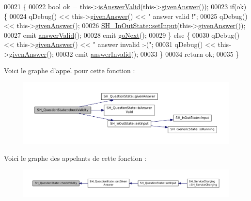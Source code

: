 \begin{DoxyCode}
00021 \{
00022     \textcolor{keywordtype}{bool} ok = this->\hyperlink{classSH__QuestionState_a8780740599e2e183560a670ff9874708}{isAnswerValid}(this->\hyperlink{classSH__QuestionState_a29cdea8bc55e39e3ed02d24743c30f8c}{givenAnswer}());
00023     \textcolor{keywordflow}{if}(ok) \{
00024         qDebug() << this->\hyperlink{classSH__QuestionState_a29cdea8bc55e39e3ed02d24743c30f8c}{givenAnswer}() << \textcolor{stringliteral}{" answer valid !"};
00025         qDebug() << this->\hyperlink{classSH__QuestionState_a29cdea8bc55e39e3ed02d24743c30f8c}{givenAnswer}();
00026         \hyperlink{classSH__InOutState_aaec9c2b5ef7c406bff7469461352d47c}{SH\_InOutState::setInput}(this->\hyperlink{classSH__QuestionState_a29cdea8bc55e39e3ed02d24743c30f8c}{givenAnswer}());
00027         emit \hyperlink{classSH__QuestionState_a04e259643788d15ab6244bc8a04286d6}{answerValid}();
00028         emit \hyperlink{classSH__GenericState_a34c1bebc765cc3a62d66c94c37d4f0c3}{goNext}();
00029     \} \textcolor{keywordflow}{else} \{
00030         qDebug() << this->\hyperlink{classSH__QuestionState_a29cdea8bc55e39e3ed02d24743c30f8c}{givenAnswer}() << \textcolor{stringliteral}{" answer invalid :-("};
00031         qDebug() << this->\hyperlink{classSH__QuestionState_a29cdea8bc55e39e3ed02d24743c30f8c}{givenAnswer}();
00032         emit \hyperlink{classSH__QuestionState_a3348a8a683130678ac87a10ba2a25486}{answerInvalid}();
00033     \}
00034     \textcolor{keywordflow}{return} ok;
00035 \}
\end{DoxyCode}


Voici le graphe d'appel pour cette fonction \-:
\nopagebreak
\begin{figure}[H]
\begin{center}
\leavevmode
\includegraphics[width=350pt]{classSH__QuestionState_a902be003650c33d954d707b2d3ee0bb9_cgraph}
\end{center}
\end{figure}




Voici le graphe des appelants de cette fonction \-:\nopagebreak
\begin{figure}[H]
\begin{center}
\leavevmode
\includegraphics[width=350pt]{classSH__QuestionState_a902be003650c33d954d707b2d3ee0bb9_icgraph}
\end{center}
\end{figure}


